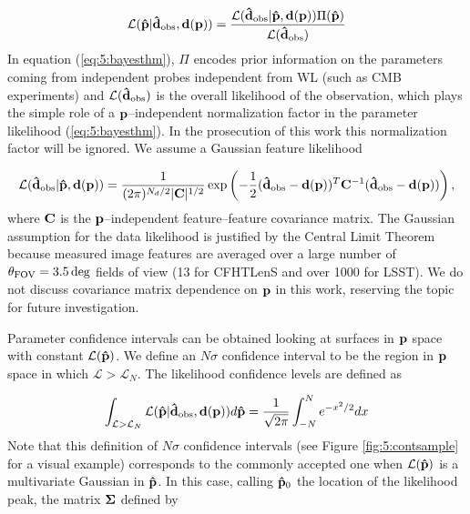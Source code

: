 \begin{equation}
\label{eq:5:bayesthm}
\mathcal{L}(\mathbf{\hat{p}}\vert\mathbf{\hat{d}}_{\rm obs},\mathbf{d}(\mathbf{p})) = \frac{\mathcal{L}(\mathbf{\hat{d}}_{\rm obs}\vert\mathbf{\hat{p}},\mathbf{d}(\mathbf{p}))\Pi(\mathbf{\hat{p}})}{\mathcal{L}(\mathbf{\hat{d}}_{\rm obs})}
\end{equation}
%
In equation (\ref{eq:5:bayesthm}), $\Pi$ encodes prior information on the parameters coming from independent probes independent from WL (such as CMB experiments) and $\mathcal{L}(\mathbf{\hat{d}}_{\rm obs})$ is the overall likelihood of the observation, which plays the simple role of a $\mathbf{p}$--independent normalization factor in the parameter likelihood (\ref{eq:5:bayesthm}). In the prosecution of this work this normalization factor will be ignored. We assume a Gaussian feature likelihood 

\begin{equation}
\label{eq:5:gaussfeatlik}
\mathcal{L}(\mathbf{\hat{d}}_{\rm obs}\vert\mathbf{\hat{p}},\mathbf{d}(\mathbf{p})) = \frac{1}{(2\pi)^{N_d/2}\vert\mathbf{C}\vert^{1/2}}\exp\left(-\frac{1}{2}(\mathbf{\hat{d}}_{\rm obs}-\mathbf{d}(\mathbf{p}))^T\mathbf{C}^{-1}(\mathbf{\hat{d}}_{\rm obs}-\mathbf{d}(\mathbf{p}))\right), 
\end{equation}
%
where $\mathbf{C}$ is the $\mathbf{p}$--independent feature--feature covariance matrix. The Gaussian assumption for the data likelihood is justified by the Central Limit Theorem because measured image features are averaged over a large number of $\theta_{\rm FOV}=3.5\,{\rm deg}$ fields of view (13 for CFHTLenS and over 1000 for LSST). We do not discuss covariance matrix dependence on $\mathbf{p}$ in this work, reserving the topic for future investigation. 

Parameter confidence intervals can be obtained looking at surfaces in $\mathbf{p}$ space with constant $\mathcal{L}(\mathbf{\hat{p}})$. We define an $N\sigma$ confidence interval to be the region in $\mathbf{p}$ space in which $\mathcal{L}>\mathcal{L}_N$. The likelihood confidence levels are defined as 

\begin{equation}
\label{eq:5:liklevel}
\int_{\mathcal{L}>\mathcal{L}_N}\mathcal{L}(\mathbf{\hat{p}}\vert\mathbf{\hat{d}}_{\rm obs},\mathbf{d}(\mathbf{p})) d\mathbf{\hat{p}} = \frac{1}{\sqrt{2\pi}}\int_{-N}^Ne^{-x^2/2}dx
\end{equation}  
%
Note that this definition of $N\sigma$ confidence intervals (see Figure \ref{fig:5:contsample} for a visual example) corresponds to the commonly accepted one when $\mathcal{L}(\mathbf{\hat{p}})$ is a multivariate Gaussian in $\mathbf{\hat{p}}$. In this case, calling $\mathbf{\hat{p}}_0$ the location of the likelihood peak, the matrix $\mathbf{\Sigma}$ defined by

